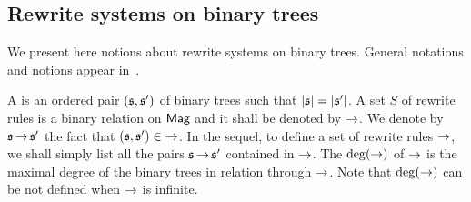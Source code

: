 \subsection{Rewrite systems on binary trees}
We present here notions about rewrite systems on binary trees. General
notations and notions appear in~\cite{BN98}.
\medbreak

A  is an ordered pair $(\mathfrak{s}, \mathfrak{s}')$ of binary trees
such that $|\mathfrak{s}| = |\mathfrak{s}'|$. A set $S$ of rewrite rules is a binary
relation on $\mathsf{Mag}$ and it shall be denoted by $\operatorname{\to}$. We denote by
$\mathfrak{s} \operatorname{\to} \mathfrak{s}'$ the fact that $(\mathfrak{s}, \mathfrak{s}') \in \operatorname{\to}$. In the sequel,
to define a set of rewrite rules $\operatorname{\to}$, we shall simply list all the
pairs $\mathfrak{s} \operatorname{\to} \mathfrak{s}'$ contained in $\operatorname{\to}$. The 
$\mathrm{deg}(\operatorname{\to})$ of $\operatorname{\to}$ is the maximal degree of the binary trees in
relation through $\operatorname{\to}$. Note that $\mathrm{deg}(\operatorname{\to})$ can be not defined when
$\operatorname{\to}$ is infinite.
\medbreak

